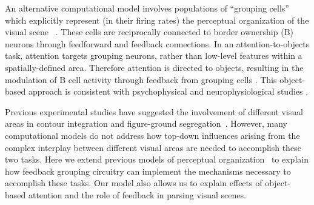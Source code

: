 An alternative computational model involves populations of ``grouping cells'' which explicitly represent (in their
firing rates) the perceptual organization of the visual scene ~\citep{Craft_etal07}.  These
cells are reciprocally connected to border ownership (B) neurons
through feedforward and feedback connections. In an
attention-to-objects task, attention targets grouping neurons, rather
than low-level features within a spatially-defined area. Therefore
attention is directed to 
objects,
%
 resulting in the modulation of B cell activity
through feedback from grouping cells \citep{Mihalas_etal11b}.  This
%
 object-based
 approach is consistent with psychophysical and
neurophysiological studies 
\citep[\eg][]{Duncan84,Egly_etal94,Scholl01,Kimchi_etal07,Qiu_etal07,Ho_Yeh09,Poort_etal12}.

Previous experimental studies have suggested the involvement of different visual areas in contour integration and figure-ground segregation~\citep{Poort_etal12,Chen_etal14}.
However, many computational models do not address how top-down influences arising from the complex interplay between different visual areas are needed to accomplish these two tasks. Here we extend previous models of perceptual organization~\citep{Craft_etal07,Mihalas_etal11b} to explain how feedback grouping circuitry can implement the mechanisms necessary to accomplish these tasks. Our model also allows us to explain
effects of 
%
object-based
%
 attention and
the role of feedback in parsing visual scenes.

